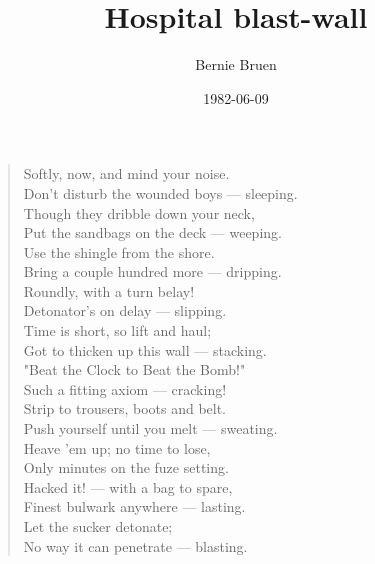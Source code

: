 \documentclass{article}
\title{Hospital blast-wall}
\author{Bernie Bruen}
\date{1982-06-09}
\begin{document}
\maketitle

\begin{verse}

Softly, now, and mind your noise. \\
Don't disturb the wounded boys --- sleeping. \\ 
Though they dribble down your neck, \\ 
Put the sandbags on the deck --- weeping. \\
Use the shingle from the shore. \\ 
Bring a couple hundred more --- dripping. \\ 
Roundly, with a turn belay! \\ 
Detonator's on delay --- slipping. \\
Time is short, so lift and haul; \\ 
Got to thicken up this wall --- stacking. \\ 
"Beat the Clock to Beat the Bomb!" \\ 
Such a fitting axiom --- cracking! \\ 
Strip to trousers, boots and belt. \\ 
Push yourself until you melt --- sweating. \\ 
Heave 'em up; no time to lose, \\ 
Only minutes on the fuze setting. \\ 
Hacked it! --- with a bag to spare, \\ 
Finest bulwark anywhere --- lasting. \\ 
Let the sucker detonate; \\ 
No way it can penetrate --- blasting.
\end{verse}
  
\end{document}
